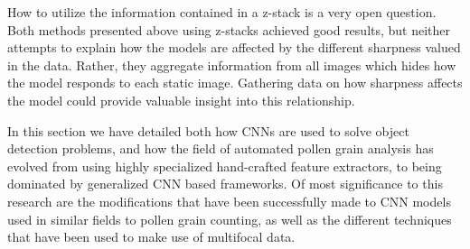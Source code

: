 How to utilize the information contained in a z-stack is a very open question.
Both methods presented above using z-stacks achieved good results, but neither attempts to explain how the models are affected by the different sharpness valued in the data.
Rather, they aggregate information from all images which hides how the model responds to each static image.
Gathering data on how sharpness affects the model could provide valuable insight into this relationship.

In this section we have detailed both how CNNs are used to solve object detection problems, and how the field of automated pollen grain analysis has evolved from using highly specialized hand-crafted feature extractors, to being dominated by generalized CNN based frameworks.
Of most significance to this research are the modifications that have been successfully made to CNN models used in similar fields to pollen grain counting, as well as the different techniques that have been used to make use of multifocal data.
